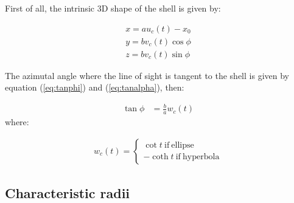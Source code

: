 First of all, the intrinsic 3D shape of the shell is given by:

\begin{align}
x = au_c(t)-x_0 \\ 
y = bv_c(t)\cos\phi \\
z =  bv_c(t)\sin\phi
\end{align}

The azimutal angle where the line of sight is tangent to the shell is given by equation (\ref{eq:tanphi}) and (\ref{eq:tanalpha}), then:

\begin{align}
\tan\phi &= \frac{b}{a}w_c(t) 
\end{align}
where:

\begin{align}
w_c(t) = \left\lbrace \begin{array}{c}
\cot t ~\mathrm{if~ellipse} \\
-\coth t ~\mathrm{if~hyperbola}
\end{array}\right.
\end{align}
\subsection{Characteristic radii}

